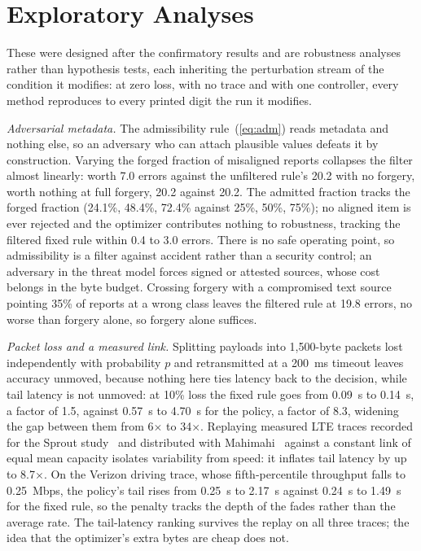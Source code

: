 \documentclass[conference,a4paper]{IEEEtran}
\newif\ifsubmission
\begin{document}
\ifsubmission
\section{Exploratory Analyses}
\label{sec:exploratory}
These were designed after the confirmatory results and are robustness analyses rather than hypothesis tests, each inheriting the perturbation stream of the condition it modifies: at zero loss, with no trace and with one controller, every method reproduces to every printed digit the run it modifies.

\label{sec:forgery}%
\emph{Adversarial metadata.} The admissibility rule~(\ref{eq:adm}) reads metadata and nothing else, so an adversary
who can attach plausible values defeats it by construction. Varying the forged fraction of
misaligned reports collapses the filter almost linearly: worth 7.0 errors against the unfiltered rule's 20.2 with
no forgery, worth nothing at full forgery, 20.2 against 20.2. The admitted fraction tracks
the forged fraction (24.1\%, 48.4\%, 72.4\% against 25\%, 50\%, 75\%); no aligned item is
ever rejected and the optimizer contributes nothing to robustness, tracking the filtered fixed rule within
0.4 to 3.0 errors. There is no safe operating point, so admissibility is a filter against accident rather than a security control; an adversary in the threat model forces signed or attested sources, whose cost belongs in the byte budget. Crossing forgery with a compromised text source pointing 35\% of reports at a wrong class leaves the filtered rule at 19.8 errors, no worse than forgery alone, so forgery alone suffices.

\label{sec:link}%
\emph{Packet loss and a measured link.} Splitting payloads into 1,500-byte packets lost
independently with probability $p$ and retransmitted at a 200~ms timeout leaves accuracy
unmoved, because nothing here ties latency back to the decision, while tail latency is not
unmoved: at 10\% loss the fixed rule goes from 0.09~s to 0.14~s, a factor of 1.5, against
0.57~s to 4.70~s for the policy, a factor of 8.3, widening the gap between them from
6$\times$ to 34$\times$. Replaying measured LTE traces recorded for the Sprout study~\cite{sprout} and distributed with Mahimahi~\cite{mahimahi} against a constant link of equal mean capacity isolates variability from speed: it inflates tail latency by up to 8.7$\times$. On the Verizon driving trace, whose fifth-percentile throughput falls to 0.25~Mbps, the policy's tail rises from 0.25~s to 2.17~s against 0.24~s to 1.49~s for the fixed rule, so the penalty tracks the depth of the fades rather than the average rate. The tail-latency ranking survives the replay on all three traces; the idea that the optimizer's extra bytes are cheap does not.
\end{document}
